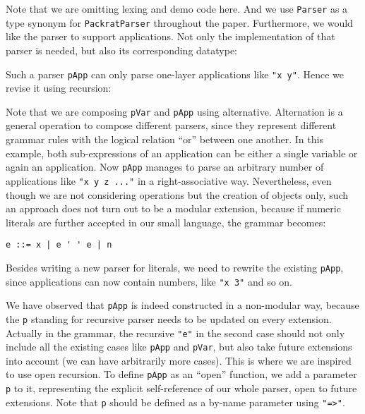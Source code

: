 Note that we are omitting lexing and demo code here. And we use \lstinline{Parser} as a type synonym for \lstinline{PackratParser} throughout the paper. Furthermore, we would like the parser to support applications.
Not only the implementation of that parser is needed, but also its corresponding datatype:


Such a parser \lstinline{pApp} can only parse one-layer applications like \lstinline{"x y"}. Hence we revise it using recursion:


Note that we are composing \lstinline{pVar} and \lstinline{pApp} using alternative. Alternation is a general operation to compose different parsers, since they represent different grammar rules with the logical relation ``or'' between one another. In this example, both sub-expressions of an application can be either a single variable or again an application. Now \lstinline{pApp} manages to parse an arbitrary number of applications like \lstinline{"x y z ..."} in a right-associative way.
Nevertheless, even though we are not considering operations but the creation of objects only, such an approach does not turn out to be a modular extension, because if numeric literals are further accepted in our small language, the grammar becomes:
\begin{lstlisting}
e ::= x | e ' ' e | n
\end{lstlisting}
Besides writing a new parser for literals, we need to rewrite the existing \lstinline{pApp}, since applications can now contain numbers, like \lstinline{"x 3"} and so on.



We have observed that \lstinline{pApp} is indeed constructed in a
non-modular way, because the \lstinline{p} standing for recursive
parser needs to be updated on every extension. Actually in the
grammar, the recursive \lstinline{"e"} in the second case should not
only include all the existing cases like \lstinline{pApp} and
\lstinline{pVar}, but also take future extensions into account (we can
have arbitrarily more cases). This is where we are inspired to use
open recursion. To define \lstinline{pApp} as an ``open'' function, we
add a parameter \lstinline{p} to it, representing the explicit
self-reference of our whole parser, open to future extensions. Note
that \lstinline{p} should be defined as a by-name parameter using
\lstinline{"=>"}.


